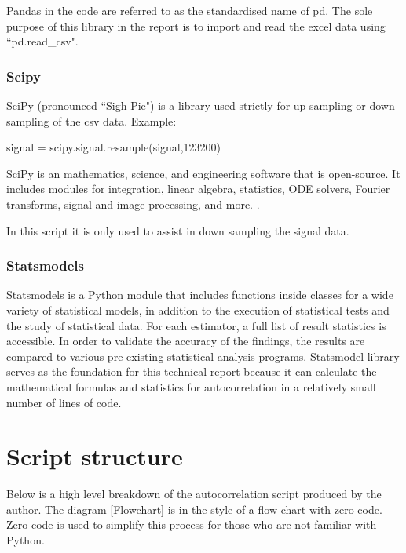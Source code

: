Pandas in the code are referred to as the standardised name of pd. The sole purpose of this library in the report is to import and read the excel data using ``pd.read\_csv".

\subsubsection{Scipy}

SciPy (pronounced ``Sigh Pie") is a library used strictly for up-sampling or down-sampling of the csv data. Example:
\begin{python}
signal = scipy.signal.resample(signal,123200)
\end{python}

SciPy is an mathematics, science, and engineering software that is open-source. It includes modules for integration, linear algebra, statistics,  ODE solvers, Fourier transforms, signal and image processing, and more. \cite{Scipy}.  

In this script it is only used to assist in down sampling the signal data. 


\subsubsection{Statsmodels}

Statsmodels is a Python module that includes functions inside classes for a wide variety of statistical models, in addition to the execution of statistical tests and the study of statistical data. For each estimator, a full list of result statistics is accessible. In order to validate the accuracy of the findings, the results are compared to various pre-existing statistical analysis programs.\cite{law2019stumpy} 
Statsmodel library serves as the foundation for this technical report because it can calculate the mathematical formulas and statistics for autocorrelation in a relatively small number of lines of code.

\section{Script structure}

Below is a high level breakdown of the autocorrelation script produced by the author. The diagram \ref{Flowchart} is in the style of a flow chart with zero code. Zero code is used to simplify this process for those who are not familiar with Python. 

